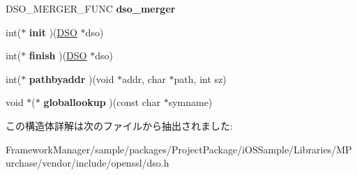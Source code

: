 \begin{DoxyCompactItemize}
\item 
\hypertarget{structdso__meth__st_a69ab12d20b8622ad9ac892e9feb29a10}{}D\+S\+O\+\_\+\+M\+E\+R\+G\+E\+R\+\_\+\+F\+U\+N\+C {\bfseries dso\+\_\+merger}\label{structdso__meth__st_a69ab12d20b8622ad9ac892e9feb29a10}

\item 
\hypertarget{structdso__meth__st_af88ab1073bac7849a6b23a0cb7df4872}{}int($\ast$ {\bfseries init} )(\hyperlink{structdso__st}{D\+S\+O} $\ast$dso)\label{structdso__meth__st_af88ab1073bac7849a6b23a0cb7df4872}

\item 
\hypertarget{structdso__meth__st_a936ec4fc5bf24889189556a37a3c83b7}{}int($\ast$ {\bfseries finish} )(\hyperlink{structdso__st}{D\+S\+O} $\ast$dso)\label{structdso__meth__st_a936ec4fc5bf24889189556a37a3c83b7}

\item 
\hypertarget{structdso__meth__st_ae05dbf002bd9bf1d78d1ca833f225e4b}{}int($\ast$ {\bfseries pathbyaddr} )(void $\ast$addr, char $\ast$path, int sz)\label{structdso__meth__st_ae05dbf002bd9bf1d78d1ca833f225e4b}

\item 
\hypertarget{structdso__meth__st_a3aa2a99cee5689fdd4800498f4d791b6}{}void $\ast$($\ast$ {\bfseries globallookup} )(const char $\ast$symname)\label{structdso__meth__st_a3aa2a99cee5689fdd4800498f4d791b6}

\end{DoxyCompactItemize}


この構造体詳解は次のファイルから抽出されました\+:\begin{DoxyCompactItemize}
\item 
Framework\+Manager/sample/packages/\+Project\+Package/i\+O\+S\+Sample/\+Libraries/\+M\+Purchase/vendor/include/openssl/dso.\+h\end{DoxyCompactItemize}
